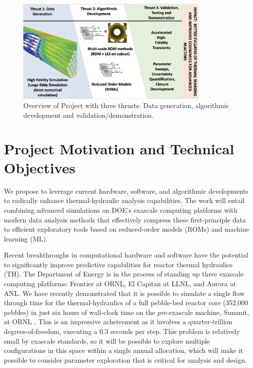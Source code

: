 \begin{figure}[h!]
    \centering
    \includegraphics[width = 0.85\textwidth]{figs/fig1.PNG}
    \caption{Overview of Project with three thrusts: Data generation, algorithmic development and validation/demonstration.}
    \label{f:01}
\end{figure}


\section{Project Motivation and Technical Objectives}

We propose to leverage current hardware, software, and algorithmic developments
to radically enhance thermal-hydraulic analysis capabilities.  The work will
entail combining advanced simulations on DOE's exascale computing platforms
with modern data analysis methods that effectively compress these
first-principle data to efficient exploratory tools based on reduced-order
models (ROMs) and machine learning (ML).

Recent breakthroughs in computational hardware and software have the potential
to significantly improve predictive capabilities for reactor thermal hydraulics
(TH).  The Department of Energy is in the process of standing up three exascale
computing platforms: Frontier at ORNL, El Capitan at LLNL, and Aurora at ANL.
We have recently demonstrated that it is possible to simulate a single flow
through time for the thermal-hydraulics of a full pebble-bed reactor core
(352,000 pebbles) in just six hours of wall-clock time on the {\em
pre}-exascale machine, Summit, at ORNL \cite{sc22}.   This is an impressive
acheivement as it involves a quarter-trillion degrees-of-freedom, executing a
0.3 seconds per step.  This problem is relatively small by exascale standards,
so it will be possible to explore multiple configurations in this space within
a single annual allocation, which will make it possible to consider parameter
exploration that is critical for analysis and design.

